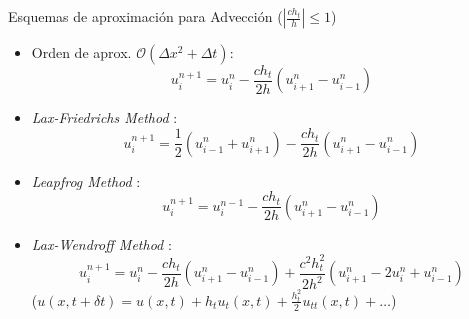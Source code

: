 \documentclass[handout]{beamer}
\begin{document}
\begin{frame}{Esquemas de aproximaci\'on para Advecci\'on ($\left|\frac{c h_t}{h}\right| \leq 1$)}

\begin{itemize}[<+->]
	\item Orden de aprox. $\mathcal{O}(\Delta x^2 + \Delta t)$: 
\begin{displaymath}
u_{i}^{n+1} = u_{i}^{n} - \dfrac{c h_t}{2 h}\left(u_{i+1}^{n} - u_{i-1}^{n} \right)
\end{displaymath}	
	\item \textit{Lax-Friedrichs Method} :
\begin{displaymath}
u_{i}^{n+1} =  \dfrac{1}{2}\left(u_{i-1}^{n} + u_{i+1}^{n}\right) - \dfrac{c h_t}{2 h}\left(u_{i+1}^{n} - u_{i-1}^{n} \right)
\end{displaymath}		
	\item \textit{Leapfrog Method} :
\begin{displaymath}
u_{i}^{n+1} =  u_{i}^{n-1} - \dfrac{c h_t}{2 h}\left(u_{i+1}^{n} - u_{i-1}^{n} \right)
\end{displaymath}		
	\item \textit{Lax-Wendroff Method} :
\begin{displaymath}
u_{i}^{n+1} = u_{i}^{n} - \dfrac{c h_t}{2 h}\left(u_{i+1}^{n} - u_{i-1}^{n} \right) + \dfrac{c^2 h_t^2}{2 h^2}\left(u_{i+1}^{n} - 2u_{i}^{n} + u_{i-1}^{n} \right)
\end{displaymath}	
 ({\footnotesize $u(x,t+\delta t) = u(x,t) + h_t u_t(x,t) + \frac{h_t^2}{2} u_{tt}(x,t)+\dots  $})

\end{itemize}

\end{frame}
	
\end{document}
